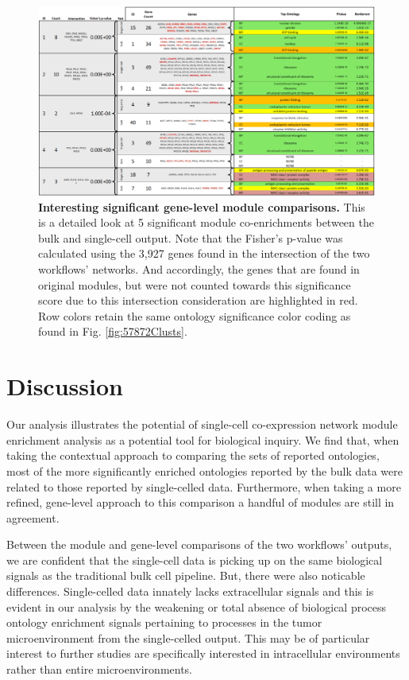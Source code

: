 \documentclass[10pt,letterpaper]{article}
\begin{document}
\begin{figure}
\centering
\includegraphics[width=180mm]{Figures/PopVsSCGeneLevel}
\caption{\textbf{Interesting significant gene-level module comparisons.} This is a detailed look at 5 significant module co-enrichments between the bulk and single-cell output. Note that the Fisher's p-value was calculated using the 3,927 genes found in the intersection of the two workflows' networks. And accordingly, the genes that are found in original modules, but were not counted towards this significance score due to this intersection consideration are highlighted in red. Row colors retain the same ontology significance color coding as found in Fig. \ref{fig:57872Clusts}.}
\label{fig:geneLevelChart}
\end{figure}

\clearpage 

\section*{Discussion}

Our analysis illustrates the potential of single-cell co-expression network module enrichment analysis as a potential tool for biological inquiry. We find that, when taking the contextual approach to comparing the sets of reported ontologies, most of the more significantly enriched ontologies reported by the bulk data were related to those reported by single-celled data. Furthermore, when taking a more refined, gene-level approach to this comparison a handful of modules are still in agreement.

Between the module and gene-level comparisons of the two workflows' outputs, we are confident that the single-cell data is picking up on the same biological signals as the traditional bulk cell pipeline. But, there were also noticable differences. Single-celled data innately lacks extracellular signals and this is evident in our analysis by the weakening or total absence of biological process ontology enrichment signals pertaining to processes in the tumor microenvironment from the single-celled output. This may be of particular interest to further studies 
 are specifically interested in intracellular environments rather than entire microenvironments.
\end{document}
